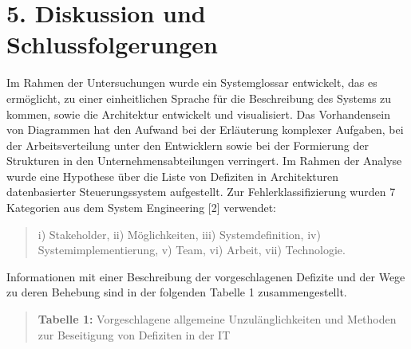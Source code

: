\documentclass[11pt,a4paper]{article}
\begin{document}
\section*{5. Diskussion und Schlussfolgerungen}

Im Rahmen der Untersuchungen wurde ein Systemglossar entwickelt, das es
ermöglicht, zu einer einheitlichen Sprache für die Beschreibung des Systems zu
kommen, sowie die Architektur entwickelt und visualisiert.  Das Vorhandensein
von Diagrammen hat den Aufwand bei der Erläuterung komplexer Aufgaben, bei der
Arbeitsverteilung unter den Entwicklern sowie bei der Formierung der
Strukturen in den Unternehmensabteilungen verringert.  Im Rahmen der Analyse
wurde eine Hypothese über die Liste von Defiziten in Architekturen
datenbasierter Steuerungssystem aufgestellt.  Zur Fehlerklassifizierung wurden
7 Kategorien aus dem System Engineering [2] verwendet: 
\begin{quote}
  i) Stakeholder, ii) Möglichkeiten, iii) Systemdefinition, iv)
  Systemimplementierung, v) Team, vi) Arbeit, vii) Technologie.
\end{quote}
Informationen mit einer Beschreibung der vorgeschlagenen Defizite und der Wege
zu deren Behebung sind in der folgenden Tabelle 1 zusammengestellt.

\begin{quote}
  \textbf{Tabelle 1:} Vorgeschlagene allgemeine Unzulänglichkeiten und
  Methoden zur Beseitigung von Defiziten in der IT
\end{quote}
\end{document}
